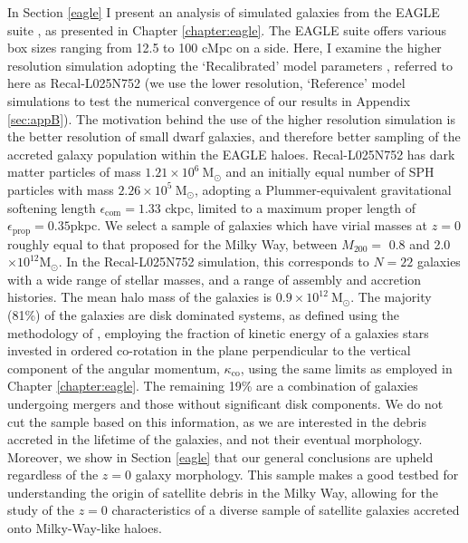 In Section \ref{eagle} I present an analysis of simulated
galaxies from the EAGLE suite
\citep{2015MNRAS.446..521S,2015MNRAS.450.1937C}, as presented in Chapter \ref{chapter:eagle}.  The EAGLE suite offers various box sizes ranging from 12.5 to 100 cMpc on a side. Here, I examine the higher resolution simulation
adopting the `Recalibrated' model parameters
\citep[see][]{2015MNRAS.446..521S}, referred to here as Recal-L025N752
(we use the lower resolution, `Reference' model simulations to test
the numerical convergence of our results in Appendix \ref{sec:appB}).
The motivation behind the use of the higher resolution simulation
is the better resolution of small dwarf galaxies, and therefore
better sampling of the accreted galaxy population within the EAGLE
haloes. Recal-L025N752 has dark matter particles of mass $1.21\times
10^{6}\ \mathrm{M_{\odot}}$ and an initially equal number of SPH
particles with mass $2.26\times 10^{5}\ \mathrm{M_{\odot}}$, adopting
a Plummer-equivalent gravitational softening length
$\epsilon_\mathrm{com}=1.33$ ckpc, limited to a maximum proper
length of $\epsilon_\mathrm{prop}=0.35$pkpc. We select a sample of
galaxies which have virial masses at $z=0$ roughly equal
to that proposed for the Milky Way, between $M_{200} = $ 0.8 and
2.0 $ \times 10^{12}\mathrm{M_{\odot}}$.
In the Recal-L025N752 simulation, this corresponds to $N=22$ galaxies
with a wide range of stellar masses, and a range of assembly and
accretion histories.  The mean halo mass of the galaxies is
$0.9\times10^{12}\ \mathrm{M_\odot}$.  The majority (81\%) of the
galaxies are disk dominated systems, as defined using the methodology
of \citet{2017arXiv170406283C}, employing the fraction of
kinetic energy of a galaxies stars invested in ordered co-rotation
in the plane perpendicular to the vertical component of
the angular momentum, $\kappa_{\mathrm{co}}$, using the same limits as employed in Chapter \ref{chapter:eagle}.
The remaining 19\% are a combination of galaxies undergoing mergers
and those without significant disk components. We do not cut the
sample based on this information, as we are interested in the debris
accreted in the lifetime of the galaxies, and not their eventual
morphology. Moreover, we show in Section \ref{eagle} that
our general conclusions are upheld regardless of the $z=0$ galaxy
morphology.  This sample makes a good testbed for understanding the
origin of satellite debris in the Milky Way, allowing for the study of
the $z=0$ characteristics of a diverse sample of satellite galaxies
accreted onto Milky-Way-like haloes.

